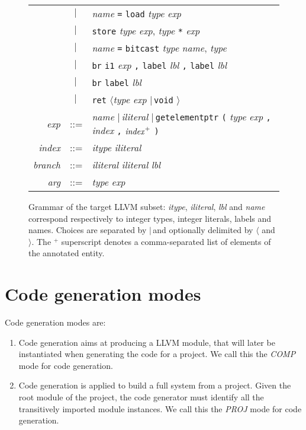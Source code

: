 \documentclass{llncs}
\newcommand{\llvm}[1]{\texttt{#1}}
\newcommand{\lalt}[0]{$\langle$\xspace}
\newcommand{\ralt}[0]{$\rangle$\xspace}
\newcommand{\alt}[0]{$\mid\,$}
\newcommand{\ListOf}[1]{$\mbox{#1}^+$}
\newcommand{\nt}[1]{{\normalfont\textit{#1}}}
\begin{document}
\begin{figure}
\begin{center}
\begin{tabular}{rcl}
      & \alt & \nt{name} \llvm{=} \llvm{load} \nt{type} \nt{exp} \\
      & \alt & \llvm{store} \nt{type} \nt{exp}, \nt{type} \llvm{*} \nt{exp} \\
      & \alt & \nt{name} \llvm{=} \llvm{bitcast} \nt{type} \nt{name}, \nt{type} \\
      & \alt & \llvm{br} \llvm{i1} \nt{exp} \llvm{,} \llvm{label} \nt{lbl} \llvm{,} \llvm{label} \nt{lbl} \\
      & \alt & \llvm{br} \llvm{label} \nt{lbl} \\
      & \alt & \llvm{ret} \lalt \nt{type} \nt{exp} \alt \llvm{void} \ralt \\
      \nt{exp} & ::= & \nt{name} \alt \nt{iliteral} \alt \llvm{getelementptr} \llvm{(} \nt{type} \nt{exp} \llvm{,} \nt{index} \llvm{,} \ListOf{\nt{index}}  \llvm{)} \\
      \nt{index} & ::= & \nt{itype} \nt{iliteral} \\
      \nt{branch} & ::= & \nt{iliteral} \nt{iliteral} \nt{lbl} \\
      \nt{arg} & ::= & \nt{type} \nt{exp}
    \end{tabular}
  \end{center}
  \caption{Grammar of the target LLVM subset: \nt{itype}, \nt{iliteral}, \nt{lbl}
    and \nt{name} correspond respectively to integer types, integer literals,
    labels and names. Choices are separated by \alt and optionally delimited by
    \lalt and \ralt.  The \ListOf{} superscript denotes a comma-separated list of
    elements of the annotated entity.}
  \label{fig:llvm-grammar}
\end{figure}

\section{Code generation modes}
\label{sec:overview}

Code generation modes are:
\begin{enumerate}
\item Code generation aims at producing a LLVM module,
  that will later be instantiated when generating the code for a project. We
  call this the \emph{COMP} mode for code generation.
\item Code generation is applied to build a full system from a project. Given
  the root module of the project, the code generator must identify all the
  transitively imported module instances. We call this the \emph{PROJ} mode for
  code generation.
\end{enumerate}
\end{document}
